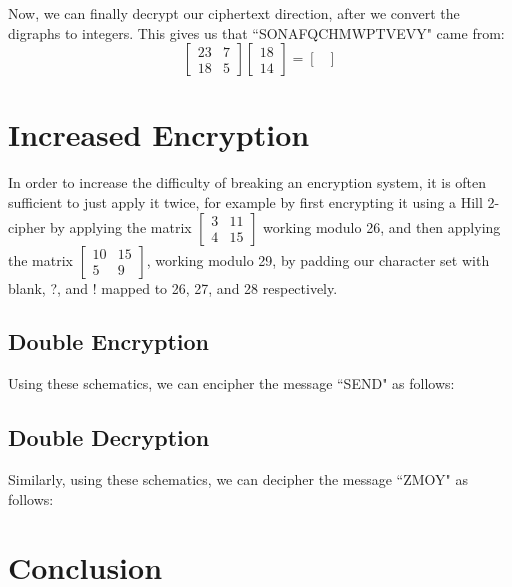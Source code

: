 \documentclass{article}
\begin{document}
Now, we can finally decrypt our ciphertext direction, after we convert the digraphs to integers. This gives us that ``SONAFQCHMWPTVEVY" came from:
\[
    \begin{bmatrix}
        23 & 7 \\
        18 & 5
    \end{bmatrix} \begin{bmatrix}
        18 \\
        14
    \end{bmatrix} = \begin{bmatrix}
        
    \end{bmatrix}
\]

\section{Increased Encryption}
In order to increase the difficulty of breaking an encryption system, it is often sufficient to just apply it twice, for example by first encrypting it using a Hill 2-cipher by applying the matrix $\begin{bmatrix}
    3 & 11 \\
    4 & 15
\end{bmatrix}$ working modulo 26, and then applying the matrix $\begin{bmatrix}
    10 & 15 \\
    5 & 9
\end{bmatrix}$, working modulo 29, by padding our character set with blank, ?, and ! mapped to 26, 27, and 28 respectively.

\subsection{Double Encryption}
Using these schematics, we can encipher the message ``SEND" as follows:

\subsection{Double Decryption}
Similarly, using these schematics, we can decipher the message ``ZMOY" as follows:

\section{Conclusion}
\end{document}
